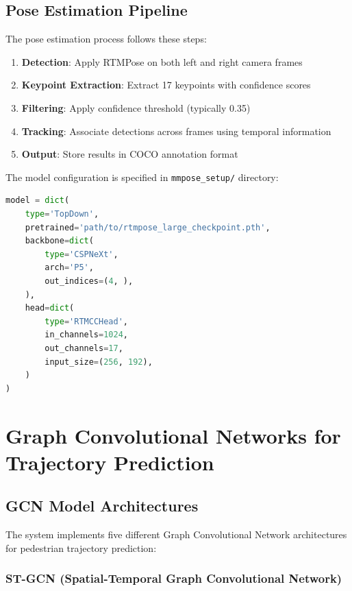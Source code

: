 \documentclass[11pt,a4paper]{article}
\begin{document}
\subsection{Pose Estimation Pipeline}

The pose estimation process follows these steps:

\begin{enumerate}
    \item \textbf{Detection}: Apply RTMPose on both left and right camera frames
    \item \textbf{Keypoint Extraction}: Extract 17 keypoints with confidence scores
    \item \textbf{Filtering}: Apply confidence threshold (typically 0.35)
    \item \textbf{Tracking}: Associate detections across frames using temporal information
    \item \textbf{Output}: Store results in COCO annotation format
\end{enumerate}

The model configuration is specified in \texttt{mmpose\_setup/} directory:

\begin{lstlisting}[language=Python, caption=RTMPose Configuration Example]
model = dict(
    type='TopDown',
    pretrained='path/to/rtmpose_large_checkpoint.pth',
    backbone=dict(
        type='CSPNeXt',
        arch='P5',
        out_indices=(4, ),
    ),
    head=dict(
        type='RTMCCHead',
        in_channels=1024,
        out_channels=17,
        input_size=(256, 192),
    )
)
\end{lstlisting}

\section{Graph Convolutional Networks for Trajectory Prediction}

\subsection{GCN Model Architectures}

The system implements five different Graph Convolutional Network architectures for pedestrian trajectory prediction:

\subsubsection{ST-GCN (Spatial-Temporal Graph Convolutional Network)}
\end{document}
